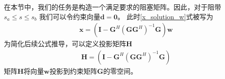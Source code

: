 \documentclass[master]{thesis-uestc}
\begin{document}
在本节中，我们的任务是构造一个满足要求的阻塞矩阵。因此，对于阻带$s_a\le s \le s_b$
我们可以令约束向量$\bm{d}=\textbf{0}$。
此时\eqref{x_solution_w}式被写为
\begin{equation}\label{x_without_d}
    \begin{aligned}
        \bm{x} = \left(\bm{I}-\bm{G}^H(\bm{G}\bm{G}^H)^{-1}\bm{G}\right)\bm{w}
    \end{aligned}
\end{equation}
为简化后续公式推导，可以定义投影矩阵$\bm{H}$
\begin{equation}\label{block_proj_mat}
    \begin{aligned}
        \bm{H} = \left(\bm{I}-\bm{G}^H(\bm{G}\bm{G}^H)^{-1}\bm{G}\right)
    \end{aligned}
\end{equation}
矩阵$\bm{H}$将向量$\bm{w}$投影到约束矩阵$\bm{G}$的零空间。
\end{document}
